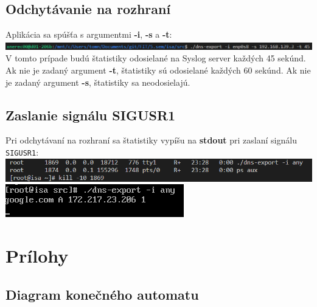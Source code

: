 \documentclass{article}
\begin{document}
        \subsection{Odchytávanie na rozhraní}
        Aplikácia sa spúšťa s argumentmi \textbf{-i}, \textbf{-s} a \textbf{-t}:\\
        \includegraphics {i1.png}
        V tomto prípade budú štatistiky odosielané na Syslog server každých 45 sekúnd. Ak nie je zadaný argument \textbf{-t},
        štatistiky sú odosielané každých 60 sekúnd. Ak nie je zadaný argument \textbf{-s}, štatistiky sa neodosielajú.

        \subsection{Zaslanie signálu SIGUSR1}
        Pri odchytávaní na rozhraní sa štatistiky vypíšu na \textbf{stdout} pri zaslaní signálu \texttt{SIGUSR1}:\\
        \includegraphics {i2.png}
        \includegraphics {i3.png}
    
    \newpage
    \section{Prílohy}
        \subsection{Diagram konečného automatu}
            \newpage
            
\end{document}
